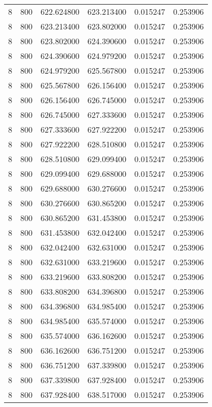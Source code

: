 \begin{longtable}{rrrrrr}
8 & 800 & 622.624800 & 623.213400 & 0.015247 & 0.253906 \\
8 & 800 & 623.213400 & 623.802000 & 0.015247 & 0.253906 \\
8 & 800 & 623.802000 & 624.390600 & 0.015247 & 0.253906 \\
8 & 800 & 624.390600 & 624.979200 & 0.015247 & 0.253906 \\
8 & 800 & 624.979200 & 625.567800 & 0.015247 & 0.253906 \\
8 & 800 & 625.567800 & 626.156400 & 0.015247 & 0.253906 \\
8 & 800 & 626.156400 & 626.745000 & 0.015247 & 0.253906 \\
8 & 800 & 626.745000 & 627.333600 & 0.015247 & 0.253906 \\
8 & 800 & 627.333600 & 627.922200 & 0.015247 & 0.253906 \\
8 & 800 & 627.922200 & 628.510800 & 0.015247 & 0.253906 \\
8 & 800 & 628.510800 & 629.099400 & 0.015247 & 0.253906 \\
8 & 800 & 629.099400 & 629.688000 & 0.015247 & 0.253906 \\
8 & 800 & 629.688000 & 630.276600 & 0.015247 & 0.253906 \\
8 & 800 & 630.276600 & 630.865200 & 0.015247 & 0.253906 \\
8 & 800 & 630.865200 & 631.453800 & 0.015247 & 0.253906 \\
8 & 800 & 631.453800 & 632.042400 & 0.015247 & 0.253906 \\
8 & 800 & 632.042400 & 632.631000 & 0.015247 & 0.253906 \\
8 & 800 & 632.631000 & 633.219600 & 0.015247 & 0.253906 \\
8 & 800 & 633.219600 & 633.808200 & 0.015247 & 0.253906 \\
8 & 800 & 633.808200 & 634.396800 & 0.015247 & 0.253906 \\
8 & 800 & 634.396800 & 634.985400 & 0.015247 & 0.253906 \\
8 & 800 & 634.985400 & 635.574000 & 0.015247 & 0.253906 \\
8 & 800 & 635.574000 & 636.162600 & 0.015247 & 0.253906 \\
8 & 800 & 636.162600 & 636.751200 & 0.015247 & 0.253906 \\
8 & 800 & 636.751200 & 637.339800 & 0.015247 & 0.253906 \\
8 & 800 & 637.339800 & 637.928400 & 0.015247 & 0.253906 \\
8 & 800 & 637.928400 & 638.517000 & 0.015247 & 0.253906 \\

\end{longtable}
